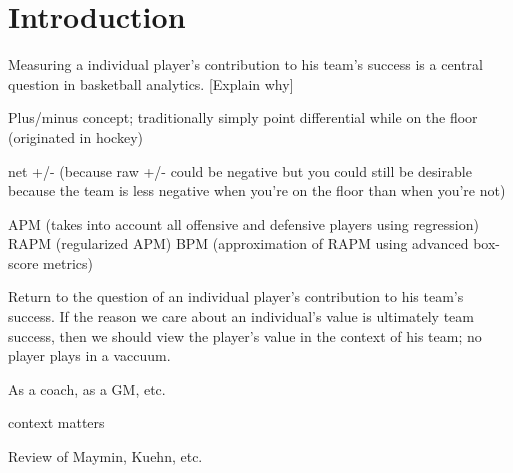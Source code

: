 \chapter{Introduction}
\label{introduction}

Measuring a individual player's contribution to his team's success is a central
question in basketball analytics. [Explain why]

Plus/minus concept; traditionally simply point differential while on the floor (originated in hockey)

net +/- (because raw +/- could be negative but you could still be desirable because the team is less negative when you're on the floor than when you're not)

APM (takes into account all offensive and defensive players using regression)
RAPM (regularized APM)
BPM (approximation of RAPM using advanced box-score metrics)


Return to the question of an individual player's contribution to his team's success. If the reason we care about an individual's value is ultimately team success, then we should view the player's value in the context of his team; no player plays in a vaccuum.

As a coach, as a GM, etc.

context matters


Review of Maymin, Kuehn, etc.
